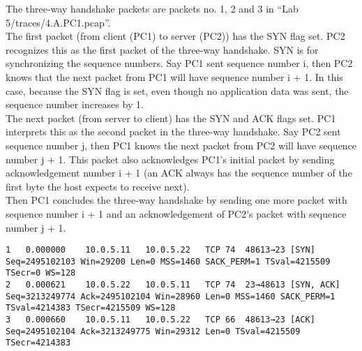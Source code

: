 The three-way handshake packets are packets no. 1, 2 and 3 in ``Lab 5/traces/4.A.PC1.pcap''. \\
The first packet (from client (PC1) to server (PC2)) has the SYN flag set. PC2 recognizes this as the first packet of the three-way handshake. SYN is for synchronizing the sequence numbers. Say PC1 sent sequence number i, then PC2 knows that the next packet from PC1 will have sequence number i + 1. In this case, because the SYN flag is set, even though no application data was sent, the sequence number increases by 1. \\
The next packet (from server to client) has the SYN and ACK flags set. PC1 interprets this as the second packet in the three-way handshake. Say PC2 sent sequence number j, then PC1 knows the next packet from PC2 will have sequence number j + 1. This packet also acknowledges PC1's initial packet by sending acknowledgement number i + 1 (an ACK always has the sequence number of the first byte the host expects to receive next). \\
Then PC1 concludes the three-way handshake by sending one more packet with sequence number i + 1 and an acknowledgement of PC2's packet with sequence number j + 1.

\begin{lstlisting}
1	0.000000	10.0.5.11	10.0.5.22	TCP	74	48613→23 [SYN] Seq=2495102103 Win=29200 Len=0 MSS=1460 SACK_PERM=1 TSval=4215509 TSecr=0 WS=128
2	0.000621	10.0.5.22	10.0.5.11	TCP	74	23→48613 [SYN, ACK] Seq=3213249774 Ack=2495102104 Win=28960 Len=0 MSS=1460 SACK_PERM=1 TSval=4214383 TSecr=4215509 WS=128
3	0.000660	10.0.5.11	10.0.5.22	TCP	66	48613→23 [ACK] Seq=2495102104 Ack=3213249775 Win=29312 Len=0 TSval=4215509 TSecr=4214383
\end{lstlisting}